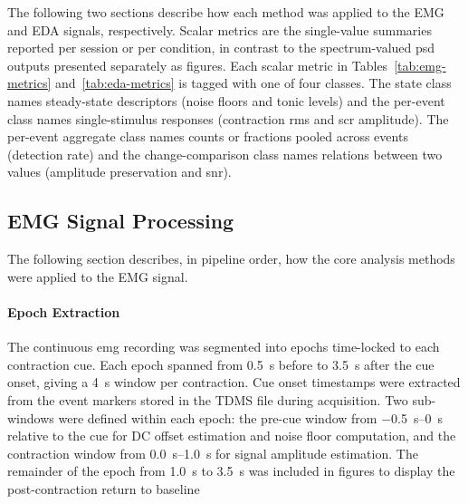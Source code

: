 The following two sections describe how each method was applied to the EMG and EDA signals, respectively. Scalar metrics are the single-value summaries reported per session or per condition, in contrast to the spectrum-valued \gls{psd} outputs presented separately as figures. Each scalar metric in Tables~\ref{tab:emg-metrics} and~\ref{tab:eda-metrics} is tagged with one of four classes. The state class names steady-state descriptors (noise floors and tonic levels) and the per-event class names single-stimulus responses (contraction \gls{rms} and \gls{scr} amplitude). The per-event aggregate class names counts or fractions pooled across events (detection rate) and the change-comparison class names relations between two values (amplitude preservation and \gls{snr}).

\subsection{EMG Signal Processing}
\label{sec:emg_processing}

The following section describes, in pipeline order, how the core analysis methods were applied to the EMG signal.

\paragraph{Epoch Extraction}
The continuous \gls{emg} recording was segmented into epochs time-locked to each contraction cue. Each epoch spanned from \SI{0.5}{\second} before to \SI{3.5}{\second} after the cue onset, giving a \SI{4}{\second} window per contraction. Cue onset timestamps were extracted from the event markers stored in the TDMS file during acquisition. Two sub-windows were defined within each epoch: the pre-cue window from \SIrange{-0.5}{0}{\second} relative to the cue for DC offset estimation and noise floor computation, and the contraction window from \SIrange{0.0}{1.0}{\second} for signal amplitude estimation. The remainder of the epoch from \SI{1.0}{\second} to \SI{3.5}{\second} was included in figures to display the post-contraction return to baseline

